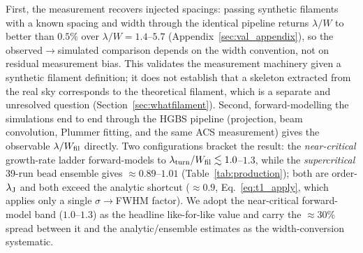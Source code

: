 \documentclass[usenatbib,twoside,twocolumn]{mnras}
\begin{document}
First, the measurement recovers injected spacings: passing synthetic filaments with a known spacing and width through the identical pipeline returns $\lambda/W$ to better than $0.5\%$ over $\lambda/W=1.4$--$5.7$ (Appendix~\ref{sec:val_appendix}), so the observed$\to$simulated comparison depends on the width convention, not on residual measurement bias. This validates the measurement machinery given a synthetic filament definition; it does not establish that a skeleton extracted from the real sky corresponds to the theoretical filament, which is a separate and unresolved question (Section~\ref{sec:whatfilament}). Second, forward-modelling the simulations end to end through the HGBS pipeline (projection, beam convolution, Plummer fitting, and the same ACS measurement) gives the observable $\lambda/W_{\rm fil}$ directly. Two configurations bracket the result: the \emph{near-critical} growth-rate ladder forward-models to $\lambda_{\rm turn}/W_{\rm fil}\lesssim1.0$--$1.3$, while the \emph{supercritical} 39-run bead ensemble gives $\approx0.89$--$1.01$ (Table~\ref{tab:production}); both are order-$\lambda_{\rm J}$ and both exceed the analytic shortcut ($\approx0.9$, Eq.~\ref{eq:t1_apply}, which applies only a single $\sigma\!\to\!$FWHM factor). We adopt the near-critical forward-model band ($1.0$--$1.3$) as the headline like-for-like value and carry the $\approx30\%$ spread between it and the analytic/ensemble estimates as the width-conversion systematic.
\end{document}
